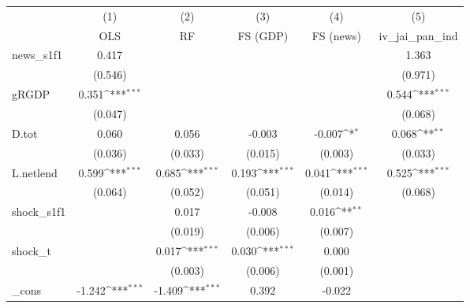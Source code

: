 {
\def\sym#1{\ifmmode^{#1}\else\(^{#1}\)\fi}
\begin{tabular}{l*{5}{c}}
\toprule
            &\multicolumn{1}{c}{(1)}&\multicolumn{1}{c}{(2)}&\multicolumn{1}{c}{(3)}&\multicolumn{1}{c}{(4)}&\multicolumn{1}{c}{(5)}\\
            &\multicolumn{1}{c}{OLS}&\multicolumn{1}{c}{RF}&\multicolumn{1}{c}{FS (GDP)}&\multicolumn{1}{c}{FS (news)}&\multicolumn{1}{c}{iv\_jai\_pan\_ind}\\
\midrule
news\_s1f1   &       0.417         &                     &                     &                     &       1.363         \\
            &     (0.546)         &                     &                     &                     &     (0.971)         \\
\addlinespace
gRGDP       &       0.351\sym{***}&                     &                     &                     &       0.544\sym{***}\\
            &     (0.047)         &                     &                     &                     &     (0.068)         \\
\addlinespace
D.tot       &       0.060         &       0.056         &      -0.003         &      -0.007\sym{*}  &       0.068\sym{**} \\
            &     (0.036)         &     (0.033)         &     (0.015)         &     (0.003)         &     (0.033)         \\
\addlinespace
L.netlend   &       0.599\sym{***}&       0.685\sym{***}&       0.193\sym{***}&       0.041\sym{***}&       0.525\sym{***}\\
            &     (0.064)         &     (0.052)         &     (0.051)         &     (0.014)         &     (0.068)         \\
\addlinespace
shock\_s1f1  &                     &       0.017         &      -0.008         &       0.016\sym{**} &                     \\
            &                     &     (0.019)         &     (0.006)         &     (0.007)         &                     \\
\addlinespace
shock\_t     &                     &       0.017\sym{***}&       0.030\sym{***}&       0.000         &                     \\
            &                     &     (0.003)         &     (0.006)         &     (0.001)         &                     \\
\addlinespace
\_cons      &      -1.242\sym{***}&      -1.409\sym{***}&       0.392         &      -0.022         &                     \\

\end{tabular}}
